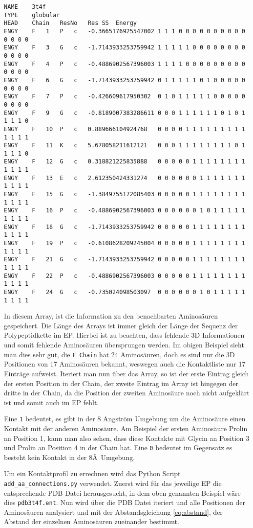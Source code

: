 \begin{lstlisting}
NAME	3t4f
TYPE	globular
HEAD	Chain	ResNo	Res	SS	Energy
ENGY	F	1	P	c	-0.3665176925547002	1 1 1 0 0 0 0 0 0 0 0 0 0 0 0 0 0
ENGY	F	3	G	c	-1.7143933253759942	1 1 1 1 1 0 0 0 0 0 0 0 0 0 0 0 0
ENGY	F	4	P	c	-0.4886902567396003	1 1 1 1 0 0 0 0 0 0 0 0 0 0 0 0 0
ENGY	F	6	G	c	-1.7143933253759942	0 1 1 1 1 1 0 1 0 0 0 0 0 0 0 0 0
ENGY	F	7	P	c	-0.426609617950302	0 1 0 1 1 1 1 1 0 0 0 0 0 0 0 0 0
ENGY	F	9	G	c	-0.8189007383286611	0 0 0 1 1 1 1 1 1 0 1 0 1 1 1 1 0
ENGY	F	10	P	c	0.889666104924768	0 0 0 0 1 1 1 1 1 1 1 1 1 1 1 1 1
ENGY	F	11	K	c	5.678058211612121	0 0 0 1 1 1 1 1 1 1 1 0 1 1 1 1 0
ENGY	F	12	G	c	0.318821225835888	0 0 0 0 0 1 1 1 1 1 1 1 1 1 1 1 1
ENGY	F	13	E	c	2.612350424331274	0 0 0 0 0 0 1 1 1 1 1 1 1 1 1 1 1
ENGY	F	15	G	c	-1.3849755172085403	0 0 0 0 0 1 1 1 1 1 1 1 1 1 1 1 1
ENGY	F	16	P	c	-0.4886902567396003	0 0 0 0 0 0 1 0 1 1 1 1 1 1 1 1 1
ENGY	F	18	G	c	-1.7143933253759942	0 0 0 0 0 1 1 1 1 1 1 1 1 1 1 1 1
ENGY	F	19	P	c	-0.6108628209245004	0 0 0 0 0 1 1 1 1 1 1 1 1 1 1 1 1
ENGY	F	21	G	c	-1.7143933253759942	0 0 0 0 0 1 1 1 1 1 1 1 1 1 1 1 1
ENGY	F	22	P	c	-0.4886902567396003	0 0 0 0 0 1 1 1 1 1 1 1 1 1 1 1 1
ENGY	F	24	G	c	-0.735024098503097	0 0 0 0 0 0 1 0 1 1 1 1 1 1 1 1 1
\end{lstlisting}

In diesem Array, ist die Information zu den benachbarten Aminosäuren gespeichert. Die Länge des Arrays ist immer gleich der Länge der Sequenz der Polypeptidkette im EP. Hierbei ist zu beachten, dass fehlende 3D Informationen und somit fehlende Aminosäuren übersprungen werden. Im obigen Beispiel sieht man dies sehr gut, die \texttt{F Chain} hat 24 Aminosäuren, doch es sind nur die 3D Positionen von 17 Aminosäuren bekannt, weswegen auch die Kontaktliste nur 17 Einträge aufweist. Iteriert man nun über das Array, so ist der erste Eintrag gleich der ersten Position in der Chain, der zweite Eintrag im Array ist hingegen der dritte in der Chain, da die Position der zweiten Aminosäure noch nicht aufgeklärt ist und somit auch im EP fehlt.

Eine \texttt{1} bedeutet, es gibt in der 8 Angström Umgebung um die Aminosäure einen Kontakt mit der anderen Aminosäure. Am Beispiel der ersten Aminosäure Prolin an Position 1, kann man also sehen, dass diese Kontakte mit Glycin an Position 3 und Prolin an Position 4 in der Chain hat. Eine \texttt{0} bedeutet im Gegensatz es besteht kein Kontakt in der 8\AA\ Umgebung.

Um ein Kontaktprofil zu errechnen wird das Python Script \texttt{add\_aa\_connections.py} verwendet. Zuerst wird für das jeweilige EP die entsprechende PDB Datei herausgesucht, in dem oben genannten Beispiel wäre dies \texttt{pdb3t4f.ent}. Nun wird über die PDB Datei iteriert und alle Positionen der Aminosäuren analysiert und mit der Abstandsgleichung \ref{eq:abstand}, der Abstand der einzelnen Aminosäuren zueinander bestimmt.


